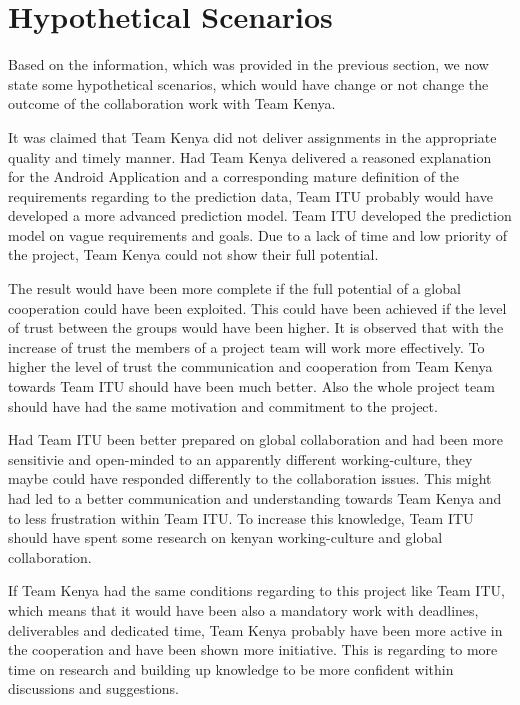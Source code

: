 
\section{Hypothetical Scenarios}

Based on the information, which was provided in the previous section, we now state some hypothetical scenarios, which would have change or not change the outcome of the collaboration work with Team Kenya.

It was claimed that Team Kenya did not deliver assignments in the appropriate quality and timely manner. Had Team Kenya delivered a reasoned explanation for the Android Application and a corresponding mature definition of the requirements regarding to the prediction data, Team ITU probably would have developed a more advanced prediction model. Team ITU developed the prediction model on vague requirements and goals. Due to a lack of time and low priority of the project, Team Kenya could not show their full potential.

The result would have been more complete if the full potential of a global cooperation could have been exploited. This could have been achieved if the level of trust between the groups would have been higher. It is observed that with the increase of trust the members of a project team will work more effectively\cite{trust}. To higher the level of trust the communication and cooperation from Team Kenya towards Team ITU should have been much better. Also the whole project team should have had the same motivation and commitment to the project.


Had Team ITU been better prepared on global collaboration and had been more sensitivie and open-minded to an apparently different working-culture, they maybe could have responded differently to the collaboration issues. This might had led to a better communication and understanding towards Team Kenya and to less frustration within Team ITU. To increase this knowledge, Team ITU should have spent some research on kenyan working-culture and global collaboration. 

If Team Kenya had the same conditions regarding to this project like Team ITU, which means that it would have been also a mandatory work with deadlines, deliverables and dedicated time, Team Kenya probably have been more active in the cooperation and have been shown more initiative. This is regarding to more time on research and building up knowledge to be more confident within discussions and suggestions.



